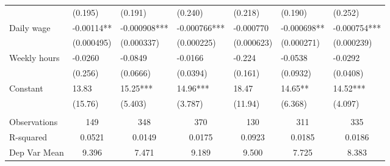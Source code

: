 \begin{tabular}{rrrrrrr}
\multicolumn{1}{l}{} & \multicolumn{1}{l}{(0.195)} & \multicolumn{1}{l}{(0.191)} & \multicolumn{1}{l}{(0.240)} & \multicolumn{1}{l}{(0.218)} & \multicolumn{1}{l}{(0.190)} & \multicolumn{1}{l}{(0.252)} \\
\multicolumn{1}{l}{Daily wage} & \multicolumn{1}{l}{-0.00114**} & \multicolumn{1}{l}{-0.000908***} & \multicolumn{1}{l}{-0.000766***} & \multicolumn{1}{l}{-0.000770} & \multicolumn{1}{l}{-0.000698**} & \multicolumn{1}{l}{-0.000754***} \\
\multicolumn{1}{l}{} & \multicolumn{1}{l}{(0.000495)} & \multicolumn{1}{l}{(0.000337)} & \multicolumn{1}{l}{(0.000225)} & \multicolumn{1}{l}{(0.000623)} & \multicolumn{1}{l}{(0.000271)} & \multicolumn{1}{l}{(0.000239)} \\
\multicolumn{1}{l}{Weekly hours} & \multicolumn{1}{l}{-0.0260} & \multicolumn{1}{l}{-0.0849} & \multicolumn{1}{l}{-0.0166} & \multicolumn{1}{l}{-0.224} & \multicolumn{1}{l}{-0.0538} & \multicolumn{1}{l}{-0.0292} \\
\multicolumn{1}{l}{} & \multicolumn{1}{l}{(0.256)} & \multicolumn{1}{l}{(0.0666)} & \multicolumn{1}{l}{(0.0394)} & \multicolumn{1}{l}{(0.161)} & \multicolumn{1}{l}{(0.0932)} & \multicolumn{1}{l}{(0.0408)} \\
\multicolumn{1}{l}{Constant} & \multicolumn{1}{l}{13.83} & \multicolumn{1}{l}{15.25***} & \multicolumn{1}{l}{14.96***} & \multicolumn{1}{l}{18.47} & \multicolumn{1}{l}{14.65**} & \multicolumn{1}{l}{14.52***} \\
\multicolumn{1}{l}{} & \multicolumn{1}{l}{(15.76)} & \multicolumn{1}{l}{(5.403)} & \multicolumn{1}{l}{(3.787)} & \multicolumn{1}{l}{(11.94)} & \multicolumn{1}{l}{(6.368)} & \multicolumn{1}{l}{(4.097)} \\
\multicolumn{1}{l}{} & \multicolumn{1}{l}{} & \multicolumn{1}{l}{} & \multicolumn{1}{l}{} & \multicolumn{1}{l}{} & \multicolumn{1}{l}{} & \multicolumn{1}{l}{} \\
\midrule
\multicolumn{1}{l}{Observations} & \multicolumn{1}{c}{149} & \multicolumn{1}{c}{348} & \multicolumn{1}{c}{370} & \multicolumn{1}{c}{130} & \multicolumn{1}{c}{311} & \multicolumn{1}{c}{335} \\
\multicolumn{1}{l}{R-squared} & \multicolumn{1}{c}{0.0521} & \multicolumn{1}{c}{0.0149} & \multicolumn{1}{c}{0.0175} & \multicolumn{1}{c}{0.0923} & \multicolumn{1}{c}{0.0185} & \multicolumn{1}{c}{0.0186} \\
\multicolumn{1}{l}{Dep Var Mean} & \multicolumn{1}{c}{9.396} & \multicolumn{1}{c}{7.471} & \multicolumn{1}{c}{9.189} & \multicolumn{1}{c}{9.500} & \multicolumn{1}{c}{7.725} & \multicolumn{1}{c}{8.383} \\

\end{tabular}
